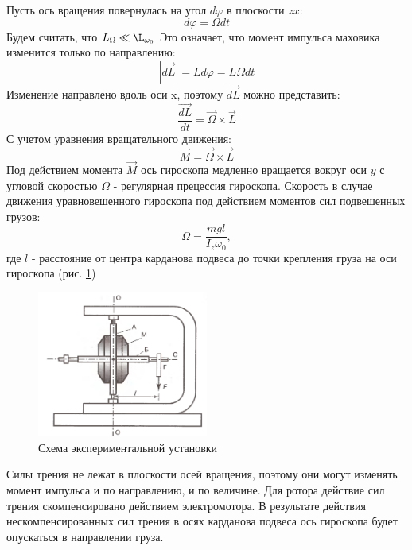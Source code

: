 \documentclass[a4paper,12pt]{article} %
\begin{document}
Пусть ось вращения повернулась на угол $d\varphi$ в плоскости $zx$:
\[d\varphi=\Omega dt\]
Будем считать, что $L_\Omega \ll \L_{\omega_0}$ 
Это означает, что момент импульса маховика изменится только по направлению:
\begin{equation}
|\overrightarrow{dL}|=Ld\varphi=L\Omega dt
\end{equation} 
Изменение направлено вдоль оси x, поэтому $\overrightarrow{dL}$ можно представить:
\begin{equation}
\frac{\overrightarrow{dL}}{dt}=\overrightarrow{\Omega}\times\overrightarrow{L}
\end{equation}
С учетом уравнения вращательного движения:
\begin{equation}
\overrightarrow{M}=\overrightarrow{\Omega}\times\overrightarrow{L}
\end{equation}
Под действием момента $\overrightarrow{M}$ ось гироскопа медленно вращается вокруг оси $y$ с угловой скоростью $\Omega$ - регулярная прецессия гироскопа.
Скорость в случае движения уравновешенного гироскопа под действием моментов сил подвешенных грузов:
\begin{equation}
\label{связь омег}
\Omega = \frac{mgl}{I_z\omega_0},
\end{equation}
где $l$ - расстояние от центра карданова подвеса до точки крепления груза на оси гироскопа (рис. \ref{схема})
\begin{figure}[h!]
\begin{center}
\includegraphics[width=0.5\textwidth]{Схема}
\end{center}
\caption{Схема экспериментальной установки} \label{схема}
\end{figure}


Силы трения не лежат в плоскости осей вращения, поэтому они могут изменять момент импульса и по направлению, и по величине. Для ротора действие сил трения скомпенсировано действием электромотора. В результате действия нескомпенсированных сил трения в осях карданова подвеса ось гироскопа будет опускаться в направлении груза.
\end{document}
